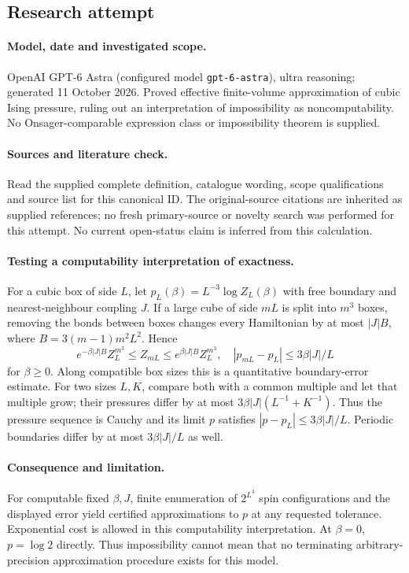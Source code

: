 \documentclass[11pt]{article}
\begin{document}
\subsection{Research attempt}
\paragraph{Model, date and investigated scope.}
OpenAI GPT-6 Astra (configured model \texttt{gpt-6-astra}), ultra reasoning; generated 11 October 2026. Proved effective finite-volume approximation of cubic Ising pressure, ruling out an interpretation of impossibility as noncomputability. No Onsager-comparable expression class or impossibility theorem is supplied.

\paragraph{Sources and literature check.}
Read the supplied complete definition, catalogue wording, scope qualifications and source list for this canonical ID. The original-source citations are inherited as supplied references; no fresh primary-source or novelty search was performed for this attempt. No current open-status claim is inferred from this calculation.

\paragraph{Testing a computability interpretation of exactness.}For a cubic box of side \(L\), let \(p_L(\beta)=L^{-3}\log Z_L(\beta)\) with free boundary and nearest-neighbour coupling \(J\). If a large cube of side \(mL\) is split into \(m^3\) boxes, removing the bonds between boxes changes every Hamiltonian by at most \(|J|B\), where \(B=3(m-1)m^2L^2\). Hence
\[e^{-\beta|J|B}Z_L^{m^3}\le Z_{mL}\le e^{\beta|J|B}Z_L^{m^3},\quad
|p_{mL}-p_L|\le 3\beta|J|/L\]
for \(\beta\ge0\). Along compatible box sizes this is a quantitative boundary-error estimate. For two sizes \(L,K\), compare both with a common multiple and let that multiple grow; their pressures differ by at most \(3\beta|J|(L^{-1}+K^{-1})\). Thus the pressure sequence is Cauchy and its limit \(p\) satisfies \(|p-p_L|\le3\beta|J|/L\). Periodic boundaries differ by at most \(3\beta|J|/L\) as well.
\paragraph{Consequence and limitation.}For computable fixed \(\beta,J\), finite enumeration of \(2^{L^3}\) spin configurations and the displayed error yield certified approximations to \(p\) at any requested tolerance. Exponential cost is allowed in this computability interpretation. At \(\beta=0\), \(p=\log2\) directly. Thus impossibility cannot mean that no terminating arbitrary-precision approximation procedure exists for this model.
\end{document}
